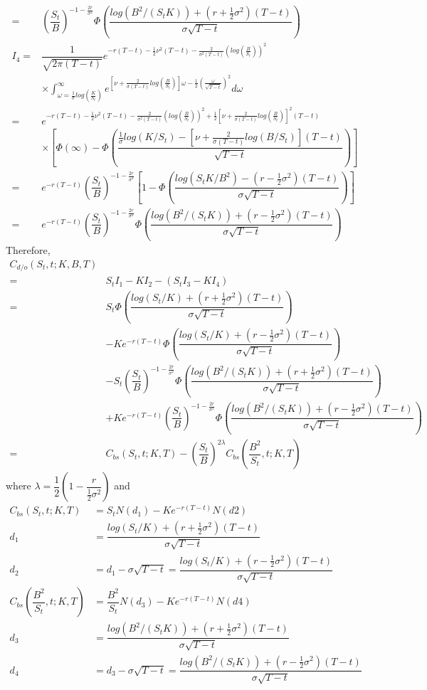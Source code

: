 \begin{align*}
=&\left(\dfrac{S_t}{B}\right)^{-1-\frac{2r}{\sigma^2}}\Phi\left(\dfrac{log(B^2/(S_tK))+(r+\frac{1}{2}\sigma^2)(T-t)}{\sigma\sqrt{T-t}}\right)\\
I_4=&\dfrac{1}{\sqrt{2\pi (T-t)}}e^{-r(T-t)-\frac{1}{2}\nu^2(T-t)-\frac{2}{\sigma^2(T-t)}\left(log\left(\frac{B}{S_t}\right)\right)^2}\\
&\times\displaystyle \int_{\omega =\frac{1}{\sigma}log\left(\frac{K}{S_t}\right) }^{\infty}e^{\left[\nu+\frac{2}{\sigma(T-t)}log\left(\frac{B}{S_t}\right)\right]\omega-\frac{1}{2}\left(\frac{\omega}{\sqrt{T-t}}\right)^2}d\omega\\
=&e^{-r(T-t)-\frac{1}{2}\nu^2(T-t)-\frac{2}{\sigma^2(T-t)}\left(log\left(\frac{B}{S_t}\right)\right)^2+\frac{1}{2}\left[\nu+\frac{2}{\sigma(T-t)}log\left(\frac{B}{S_t}\right)\right]^2(T-t)}\\
&\times \left[\Phi(\infty)-\Phi\left(\dfrac{\frac{1}{\sigma}log(K/S_t)-\left[\nu+\frac{2}{\sigma(T-t)}log(B/S_t)\right](T-t)}{\sqrt{T-t}}\right)\right]\\
=&e^{-r(T-t)}\left(\dfrac{S_t}{B}\right)^{-1-\frac{2r}{\sigma^2}}\left[1-\Phi\left(\dfrac{log(S_tK/B^2)-(r-\frac{1}{2}\sigma^2)(T-t)}{\sigma\sqrt{T-t}}\right)\right]\\
=&e^{-r(T-t)}\left(\dfrac{S_t}{B}\right)^{-1-\frac{2r}{\sigma^2}}\Phi\left(\dfrac{log(B^2/(S_tK))+(r-\frac{1}{2}\sigma^2)(T-t)}{\sigma\sqrt{T-t}}\right)
\end{align*}
Therefore, 
\begin{align*}
C_{d/o}(S_t,t;K,B,T) \\
=&S_tI_1-KI_2-(S_tI_3-KI_4)\\
=&S_t\Phi \left(\dfrac{log(S_t/K)+(r+\frac{1}{2}\sigma^2)(T-t)}{\sigma\sqrt{T-t}}\right)\\
&-Ke^{-r(T-t)}\Phi \left(\dfrac{log(S_t/K)+(r-\frac{1}{2}\sigma^2)(T-t)}{\sigma\sqrt{T-t}}\right)\\
&-S_t\left(\dfrac{S_t}{B}\right)^{-1-\frac{2r}{\sigma^2}}\Phi\left(\dfrac{log(B^2/(S_tK))+(r+\frac{1}{2}\sigma^2)(T-t)}{\sigma\sqrt{T-t}}\right)\\
&+Ke^{-r(T-t)}\left(\dfrac{S_t}{B}\right)^{-1-\frac{2r}{\sigma^2}}\Phi\left(\dfrac{log(B^2/(S_tK))+(r-\frac{1}{2}\sigma^2)(T-t)}{\sigma\sqrt{T-t}}\right)\\
=&C_{bs}(S_t,t;K,T)-\left(\dfrac{S_t}{B}\right)^{2\lambda}C_{bs}(\dfrac{B^2}{S_t},t;K,T)
\end{align*}
where $\lambda = \dfrac{1}{2}\left(1-\dfrac{r}{\frac{1}{2}\sigma^2}\right)$ and
\begin{align*}
	C_{bs}(S_t,t;K,T)&=S_tN(d_1)-Ke^{-r(T-t)}N(d2)\\
	d_1&=\dfrac{log(S_t/K)+(r+\frac{1}{2}\sigma^2)(T-t)}{\sigma\sqrt{T-t}}\\
	d_2&=d_1-\sigma\sqrt{T-t}=\dfrac{log(S_t/K)+(r-\frac{1}{2}\sigma^2)(T-t)}{\sigma\sqrt{T-t}}\\
	C_{bs}(\dfrac{B^2}{S_t},t;K,T)&=\dfrac{B^2}{S_t}N(d_3)-Ke^{-r(T-t)}N(d4)\\
	d_3&=\dfrac{log(B^2/(S_tK))+(r+\frac{1}{2}\sigma^2)(T-t)}{\sigma\sqrt{T-t}}\\
	d_4&=d_3-\sigma\sqrt{T-t}=\dfrac{log(B^2/(S_tK))+(r-\frac{1}{2}\sigma^2)(T-t)}{\sigma\sqrt{T-t}}
\end{align*}

